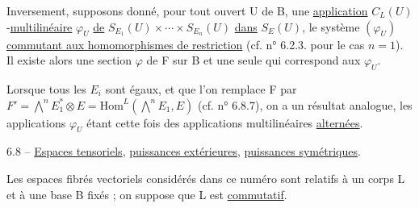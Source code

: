 Inversement, supposons donné, pour tout ouvert U de B, une \uline{application} $C_L(U)$-\uline{multilinéaire} $\varphi_U$ \uline{de} $S_{E_1}(U)\times\cdots\times S_{E_n}(U)$ \uline{dans} $S_E(U)$, le système $(\varphi_U)$ \uline{commutant aux homomorphismes de restriction} (cf. n° 6.2.3. pour le cas $n=1$). Il existe alors une section $\varphi$ de F sur B et une seule qui correspond aux $\varphi_U$.

Lorsque tous les $E_i$ sont égaux, et que l'on remplace F par $F'=\bigwedge^n E_1^*\otimes E=\mathrm{Hom}^L(\bigwedge^n E_1,E)$ (cf. n° 6.8.7), on a un résultat analogue, les applications $\varphi_U$ étant cette fois des applications multilinéaires \uline{alternées}.

6.8 -- \uline{Espaces tensoriels}, \uline{puissances extérieures}, \uline{puissances symétriques}.

Les espaces fibrés vectoriels considérés dans ce numéro sont relatifs à un corps L et à une base B fixés ; on suppose que L est \uline{commutatif}.

